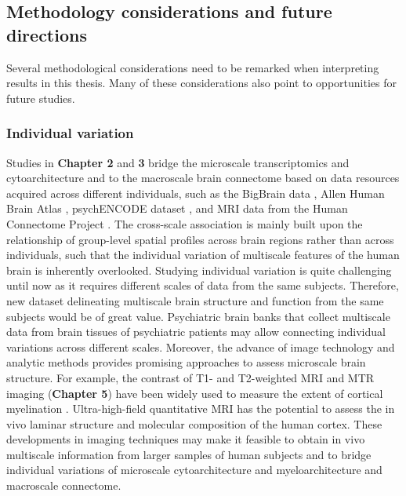 \begin{refsection}
\subsection*{Methodology considerations and future directions}
Several methodological considerations need to be remarked when interpreting results in this thesis. Many of these considerations also point to opportunities for future studies. 

\subsubsection*{Individual variation}
Studies in \textbf{Chapter 2} and \textbf{3} bridge the microscale transcriptomics and cytoarchitecture and to the macroscale brain connectome based on data resources acquired across different individuals, such as the BigBrain data \citep{amunts2013bigbrain}, Allen Human Brain Atlas \citep{Hawrylycz2012AnAC}, psychENCODE dataset \citep{sousa2017molecular}, and MRI data from the Human Connectome Project \citep{VANESSEN201362}. The cross-scale association is mainly built upon the relationship of group-level spatial profiles across brain regions rather than across individuals, such that the individual variation of multiscale features of the human brain is inherently overlooked. Studying individual variation is quite challenging until now as it requires different scales of data from the same subjects. Therefore, new dataset delineating multiscale brain structure and function from the same subjects would be of great value. Psychiatric brain banks \citep{DeepSoboslay2011PsychiatricBB} that collect multiscale data from brain tissues of psychiatric patients may allow connecting individual variations across different scales. Moreover, the advance of image technology and analytic methods provides promising approaches to assess microscale brain structure. For example, the contrast of T1- and T2-weighted MRI \citep{Glasser2011MappingHC} and MTR imaging (\textbf{Chapter 5}) have been widely used to measure the extent of cortical myelination \citep{Heath2018AdvancesIN}. Ultra-high-field quantitative MRI has the potential to assess the in vivo laminar structure \citep{Trampel2017InvivoMR} and molecular composition \citep{Filo2019DisentanglingMA} of the human cortex. These developments in imaging techniques may make it feasible to obtain in vivo multiscale information from larger samples of human subjects and to bridge individual variations of microscale cytoarchitecture and myeloarchitecture and macroscale connectome.


\end{refsection}
